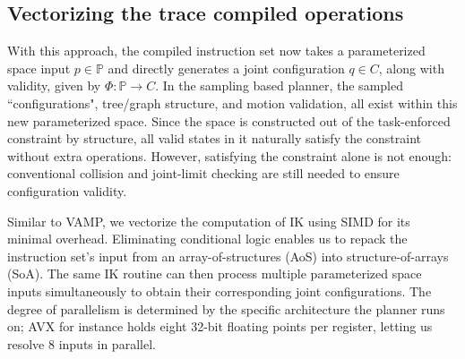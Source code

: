 \documentclass[letterpaper, 10 pt, conference]{ieeeconf}
\begin{document}
\subsection{Vectorizing the trace compiled operations}

With this approach, the compiled instruction set now takes a parameterized space input $p \in \mathbb{P}$ and directly generates a joint configuration $q \in C$, along with validity, given by $\Phi : \mathbb{P} \to C$. In the sampling based planner, the sampled ``configurations", tree/graph structure, and motion validation, all exist within this new parameterized space. Since the space is constructed out of the task-enforced constraint by structure, all valid states in it naturally satisfy the constraint without extra operations. However, satisfying the constraint alone is not enough: conventional collision and joint-limit checking are still needed to ensure configuration validity.



Similar to VAMP, we vectorize the computation of IK using SIMD for its minimal overhead. Eliminating conditional logic enables us to repack the instruction set's input from an array-of-structures (AoS) into structure-of-arrays (SoA). The same IK routine can then process multiple parameterized space inputs simultaneously to obtain their corresponding joint configurations. The degree of parallelism is determined by the specific architecture the planner runs on; AVX for instance holds eight 32-bit floating points per register, letting us resolve 8 inputs in parallel.
\end{document}
